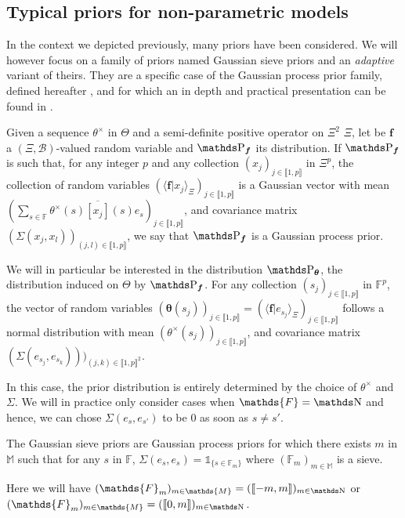\subsection{Typical priors for non-parametric models}\label{INTRO_BAYES_PRIOR}
In the context we depicted previously, many priors have been considered.
We will however focus on a family of priors named Gaussian sieve priors and an \textit{adaptive} variant of theirs.
They are a specific case of the Gaussian process prior family, defined hereafter , and for which an in depth and practical presentation can be found in .
\begin{de*}
Given a sequence $\theta^{\times}$ in $\Theta$ and a semi-definite positive operator on $\Xi^{2}$ $\Xi$, let be $\boldsymbol{f}$ a $(\Xi, \mathcal{B})$-valued random variable and $\P_{\boldsymbol{f}}$ its distribution.
If $\P_{\boldsymbol{f}}$ is such that, for any integer $p$ and any collection $(x_{j})_{j \in \llbracket 1, p \rrbracket}$ in $\Xi^{p}$, the collection of random variables $(\langle \boldsymbol{f} \vert x_{j} \rangle_{\Xi})_{j \in \llbracket 1, p \rrbracket}$ is a Gaussian vector with mean $(\sum_{s \in \mathds{F}} \theta^{\times}(s) \overline{[x_{j}]}(s) e_{s})_{j \in \llbracket 1, p \rrbracket}$, and covariance matrix $(\Sigma(x_{j}, x_{l}))_{(j, l) \in \llbracket 1, p \rrbracket}$, we say that $\P_{\boldsymbol{f}}$ is a Gaussian process prior.

We will in particular be interested in the distribution $\P_{\boldsymbol{\theta}}$, the distribution induced on $\Theta$ by $\P_{\boldsymbol{f}}$.
For any collection $(s_{j})_{j \in \llbracket 1, p \rrbracket}$ in $\mathds{F}^{p}$, the vector of random variables $(\boldsymbol{\theta}(s_{j}))_{j \in \llbracket 1, p \rrbracket} = (\langle\boldsymbol{f} \vert e_{s_{j}} \rangle_{\Xi})_{j \in \llbracket 1, p \rrbracket}$ follows a normal distribution with mean $(\theta^{\times}(s_{j}))_{j \in \llbracket 1, p \rrbracket}$, and covariance matrix $(\Sigma(e_{s_{j}}, e_{s_{k}})))_{(j, k) \in \llbracket 1, p \rrbracket^{2}}$.
\assEnd
\end{de*}
In this case, the prior distribution is entirely determined by the choice of $\theta^{\times}$ and $\Sigma$.
We will in practice only consider cases when $\mathds{F} = \N$ and hence, we can chose $\Sigma(e_{s}, e_{s'})$ to be $0$ as soon as $s \neq s'$.

\begin{de}
The Gaussian sieve priors are Gaussian process priors for which there exists $m$ in $\mathds{M}$ such that for any $s$ in $\mathds{F}$, $\Sigma(e_{s}, e_{s}) = \mathds{1}_{\{ s \in \mathds{F}_{m} \}}$ where $(\mathds{F}_{m})_{m \in \mathds{M}}$ is a sieve.
\assEnd
\end{de}
Here we will have $(\mathds{F}_{m})_{m \in \mathds{M}} = (\llbracket -m, m \rrbracket)_{m \in \N}$ or $(\mathds{F}_{m})_{m \in \mathds{M}} = (\llbracket 0, m \rrbracket)_{m \in \N}$.


